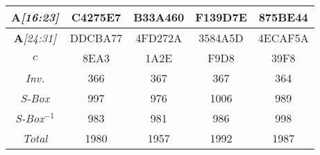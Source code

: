 \begin{sidewaystable}
\begin{center}
\begin{tabular}{|c||c|c|c|c|}
\emph{$\mathbf{A}$[16:23]} & C4275E7 &  B33A460 &  F139D7E &  875BE44  \\ \hline
\emph{$\mathbf{A}$[24:31]} & DDCBA77 &  4FD272A &  3584A5D &  4ECAF5A  \\ \hline
\emph{$c$} & 8EA3 &  1A2E &  F9D8 &  39F8  \\ \hline
\emph{Inv.} & 366 &  367 &  367 &  364  \\ \hline
\emph{S-Box} & 997 &  976 &  1006 &  989  \\ \hline
\emph{S-Box$^{-1}$} & 983 &  981 &  986 &  998  \\ \hline
\emph{Total} & 1980 &  1957 &  1992 &  1987  \\ \hline
    \end{tabular}
\end{center}
\end{sidewaystable}

